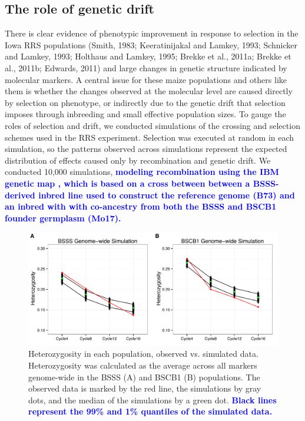 \documentclass[twocolumn,twoside,letterpaper]{article}
\newcommand{\rev}[1]{\textcolor{blue}{\bf #1}}
\begin{document}
\subsection*{The role of genetic drift}
There is clear evidence of phenotypic improvement in response to selection in the Iowa RRS populations (Smith, 1983; Keeratinijakal and Lamkey, 1993; Schnicker and Lamkey, 1993; Holthaus and Lamkey, 1995; Brekke et al., 2011a; Brekke et al., 2011b; Edwards, 2011) and large changes in genetic structure indicated by molecular markers. 
A central issue for these maize populations and others like them is whether the changes observed at the molecular level are caused directly by selection on phenotype, or indirectly due to the genetic drift that selection imposes through inbreeding and small effective population sizes. 
To gauge the roles of selection and drift, we conducted simulations of the crossing and selection schemes used in the RRS experiment.
Selection was executed at random in each simulation, so the patterns observed across simulations represent the expected distribution of effects caused only by recombination and genetic drift. 
We conducted 10,000 simulations, \rev{modeling recombination using the IBM genetic map \citep{lee2002expanding}, which is based on a cross between between a BSSS-derived inbred line used to construct the reference genome (B73) and an inbred with  with co-ancestry from both the BSSS and BSCB1 founder germplasm (Mo17).} 	

\begin{figure}[tb]   
   \includegraphics[width=0.7\linewidth]{Fig_S1_combined.pdf}
   \caption{Heterozygosity in each population, observed vs. simulated data. Heterozygosity was calculated as the average across all markers genome-wide  in the BSSS (A)  and BSCB1 (B) populations. The observed data is marked by the red line, the simulations by gray dots, and the median of the simulations by a green dot. \rev{Black lines represent the 99\% and 1\% quantiles of the simulated data.} } 
    \label{fig:compare_to_sims}
\end{figure}
\end{document}

